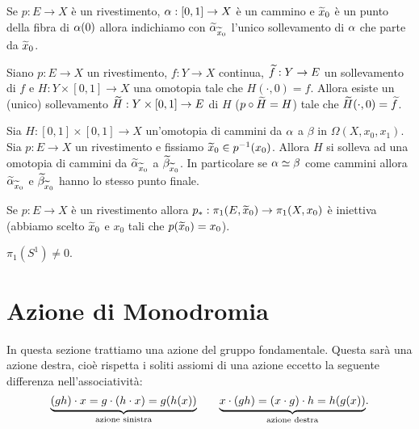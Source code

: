 \begin{multicols*}{2}
\begin{notation}
Se $p:E\to X$ è un rivestimento, $\alpha:[0,1]\to X$ è un cammino e $\widetilde{x}_0$ è un punto della fibra di $\alpha(0)$ allora indichiamo con $\widetilde{\alpha}_{\widetilde{x}_0}$ l'unico sollevamento di $\alpha$ che parte da $\widetilde{x}_0$.
\end{notation}

\begin{theorem}\label{TeoremaSollevamentoOmotopia}
Siano $p:E\to X$  un rivestimento, $f:Y\to X$ continua, $\widetilde{f}:Y\to E$ un sollevamento di $f$ e $H:Y\times [0,1]\to X$ una omotopia tale che $H(\cdot,0)=f$. Allora esiste un (unico) sollevamento $\widetilde{H}:Y\times[0,1]\to E$ di $H$ ($p\circ \widetilde{H}=H$) tale che $\widetilde{H}(\cdot, 0)=\widetilde{f}$.
\end{theorem}

\begin{theorem}\label{SollevamentoOmotopieDiCammini}
Sia $H:[0,1]\times[0,1]\to X$ un'omotopia di cammini da $\alpha$ a $\beta$ in $\Omega(X,x_0,x_1)$. Sia $p:E\to X$ un rivestimento e fissiamo $\widetilde{x}_0\in p^{-1}(x_0)$. Allora $H$ si solleva ad una omotopia di cammini da $\widetilde{\alpha}_{\widetilde{x}_0}$ a $\widetilde{\beta}_{\widetilde{x}_0}$. In particolare se $\alpha\simeq \beta$ come cammini allora $\widetilde{\alpha}_{\widetilde{x}_0}$ e $\widetilde{\beta}_{\widetilde{x}_0}$ hanno lo stesso punto finale.
\end{theorem}

\begin{corollary}\label{MappaIndottaDaRivestimentoSuGruppoFondamentaleEIniettiva}
Se $p:E\to X$ è un rivestimento allora $p_\ast:\pi_1(E,\widetilde{x}_0)\to \pi_1(X,x_0)$ è iniettiva (abbiamo scelto $\widetilde{x}_0$ e $x_0$ tali che $p(\widetilde{x}_0)=x_0$).
\end{corollary}

\begin{remark}
$\pi_1(S^1)\neq 0$.
\end{remark}




\section{Azione di Monodromia}
In questa sezione trattiamo una azione del gruppo fondamentale. Questa sarà una azione destra, cioè rispetta i soliti assiomi di una azione eccetto la seguente differenza nell'associatività:
\[\underset{\text{azione sinistra}}{\underbrace{(gh)\cdot x=g\cdot(h\cdot x)=g(h(x))}}\qquad \underset{\text{azione destra}}{\underbrace{x\cdot (gh)=(x\cdot g)\cdot h=h(g(x))}}.\]


\end{multicols*}
